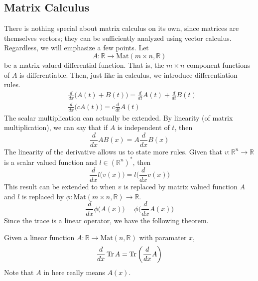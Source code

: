 \subsection{Matrix Calculus}

  There is nothing special about matrix calculus on its own, since matrices are themselves vectors; they can be sufficiently analyzed using vector calculus. Regardless, we will emphasize a few points. Let
  \begin{equation}
    A: \mathbb{R} \to \text{Mat}(m \times n, \mathbb{R})
  \end{equation}
  be a matrix valued differential function. That is, the $m \times n$ component functions of $A$ is differentiable. Then, just like in calculus, we introduce differentiation rules.
  \begin{align*}
    & \frac{d}{d x} \big( A(t) + B(t)\big) = \frac{d}{d t} A(t) + \frac{d}{d t} B(t) \\
    & \frac{d}{d x} \big( c A(t)\big) = c \frac{d}{d t} A(t)
  \end{align*}
  The scalar multiplication can actually be extended. By linearity (of matrix multiplication), we can say that if $A$ is independent of $t$, then 
  \begin{equation}
    \frac{d}{d x} A B (x) = A \frac{d}{d x} B(x)
  \end{equation}
  The linearity of the derivative allows us to state more rules. Given that $v: \mathbb{R}^n \to \mathbb{R}$ is a scalar valued function and $l \in (\mathbb{R}^n)^*$, then  
  \begin{equation}
    \frac{d}{d x} l \big( v(x) \big) = l \bigg( \frac{d}{d x} v(x) \bigg)
  \end{equation}
  This result can be extended to when $v$ is replaced by matrix valued function $A$ and $l$ is replaced by $\phi: \text{Mat}(m \times n, \mathbb{R}) \to \mathbb{R}$. 
  \begin{equation}
    \frac{d}{d x} \phi \big( A(x) \big) = \phi \bigg( \frac{d}{d x} A(x) \bigg)
  \end{equation}
  Since the trace is a linear operator, we have the following theorem. 

  \begin{theorem}
    Given a linear function $A: \mathbb{R} \to \text{Mat}(n, \mathbb{R})$ with paramater $x$, 
    \begin{equation}
      \frac{d}{d x} \operatorname{Tr}{A} = \operatorname{Tr} \bigg( \frac{d}{d x} A \bigg)
    \end{equation}
    Note that $A$ in here really means $A(x)$.
  \end{theorem}

